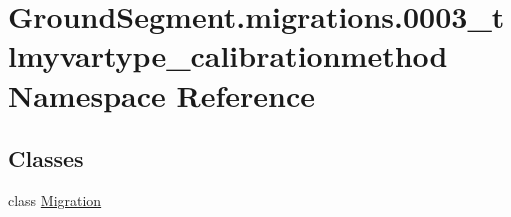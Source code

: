 \hypertarget{namespace_ground_segment_1_1migrations_1_10003__tlmyvartype__calibrationmethod}{}\section{Ground\+Segment.\+migrations.0003\+\_\+tlmyvartype\+\_\+calibrationmethod Namespace Reference}
\label{namespace_ground_segment_1_1migrations_1_10003__tlmyvartype__calibrationmethod}
\subsection*{Classes}
\begin{DoxyCompactItemize}
\item 
class \hyperlink{class_ground_segment_1_1migrations_1_10003__tlmyvartype__calibrationmethod_1_1_migration}{Migration}
\end{DoxyCompactItemize}
